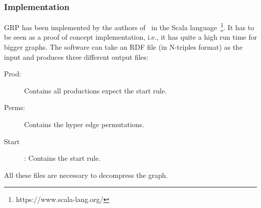 \subsubsection{Implementation}\label{sec:relatedworkGRPImpl}

GRP has been implemented by the authors of~\cite{maneth} in the Scala language~\footnote{https://www.scala-lang.org/}. It has to be seen as a proof of concept implementation, i.e., it has quite a high run time for bigger graphs. The software can take an RDF file (in N-triples format) as the input and produces three different output files:

\begin{description}
	\item [Prod:] Contains all productions expect the start rule.
	\item [Perms:] Contains the hyper edge permutations.
	\item [Start]: Contains the start rule.
\end{description} 

All these files are necessary to decompress the graph.\cite{maneth}














